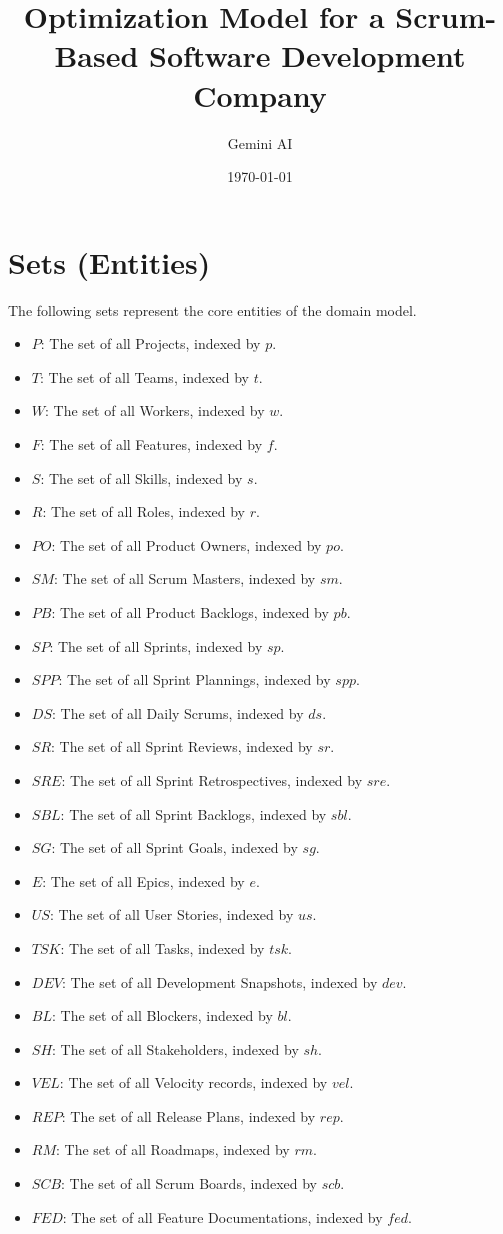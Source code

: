 \documentclass{article}
\title{Optimization Model for a Scrum-Based Software Development Company}
\author{Gemini AI}
\date{\today}
\begin{document}
\maketitle
\tableofcontents
\newpage

\section{Sets (Entities)}
The following sets represent the core entities of the domain model.
\begin{itemize}
    \item $P$: The set of all Projects, indexed by $p$.
    \item $T$: The set of all Teams, indexed by $t$.
    \item $W$: The set of all Workers, indexed by $w$.
    \item $F$: The set of all Features, indexed by $f$.
    \item $S$: The set of all Skills, indexed by $s$.
    \item $R$: The set of all Roles, indexed by $r$.
    \item $PO$: The set of all Product Owners, indexed by $po$.
    \item $SM$: The set of all Scrum Masters, indexed by $sm$.
    \item $PB$: The set of all Product Backlogs, indexed by $pb$.
    \item $SP$: The set of all Sprints, indexed by $sp$.
    \item $SPP$: The set of all Sprint Plannings, indexed by $spp$.
    \item $DS$: The set of all Daily Scrums, indexed by $ds$.
    \item $SR$: The set of all Sprint Reviews, indexed by $sr$.
    \item $SRE$: The set of all Sprint Retrospectives, indexed by $sre$.
    \item $SBL$: The set of all Sprint Backlogs, indexed by $sbl$.
    \item $SG$: The set of all Sprint Goals, indexed by $sg$.
    \item $E$: The set of all Epics, indexed by $e$.
    \item $US$: The set of all User Stories, indexed by $us$.
    \item $TSK$: The set of all Tasks, indexed by $tsk$.
    \item $DEV$: The set of all Development Snapshots, indexed by $dev$.
    \item $BL$: The set of all Blockers, indexed by $bl$.
    \item $SH$: The set of all Stakeholders, indexed by $sh$.
    \item $VEL$: The set of all Velocity records, indexed by $vel$.
    \item $REP$: The set of all Release Plans, indexed by $rep$.
    \item $RM$: The set of all Roadmaps, indexed by $rm$.
    \item $SCB$: The set of all Scrum Boards, indexed by $scb$.
    \item $FED$: The set of all Feature Documentations, indexed by $fed$.
\end{itemize}
\end{document}
